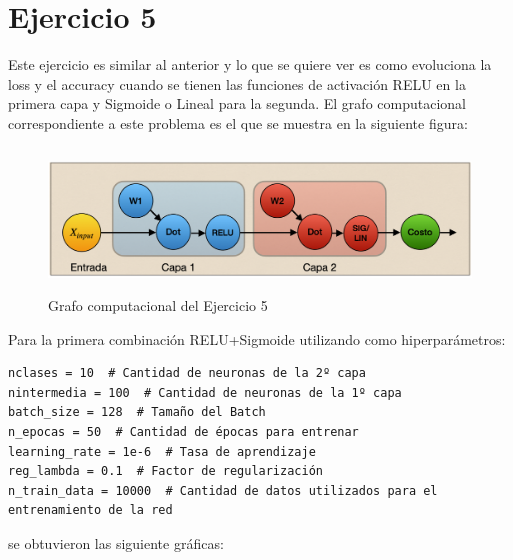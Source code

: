 \section{Ejercicio 5}

Este ejercicio es similar al anterior y lo que se quiere ver es como evoluciona la loss y el accuracy cuando se tienen las funciones de activación RELU en la primera capa y Sigmoide o Lineal para la segunda.
El grafo computacional correspondiente a este problema es el que se muestra en la siguiente figura:

\begin{figure}[H]
    \centering
    \includegraphics[height=1.5in]{image/EJ5.png}
    \caption{Grafo computacional del Ejercicio 5}
    \label{fig:ej5}
\end{figure}

Para la primera combinación RELU+Sigmoide utilizando como hiperparámetros:
\begin{verbatim}
nclases = 10  # Cantidad de neuronas de la 2º capa
nintermedia = 100  # Cantidad de neuronas de la 1º capa
batch_size = 128  # Tamaño del Batch
n_epocas = 50  # Cantidad de épocas para entrenar
learning_rate = 1e-6  # Tasa de aprendizaje
reg_lambda = 0.1  # Factor de regularización
n_train_data = 10000  # Cantidad de datos utilizados para el entrenamiento de la red
\end{verbatim}  
se obtuvieron las siguiente gráficas:

